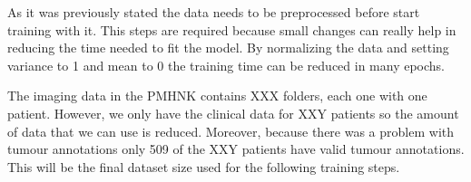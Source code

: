 

As it was previously stated the data needs to be preprocessed before start training with it.
This steps are required because small changes can really help in reducing the time needed to
fit the model. By normalizing the data and setting variance to 1 and mean to 0 the training time
can be reduced in many epochs.



The imaging data in the \Gls{PMHNK} contains XXX folders, each one with one patient. However, 
we only have the clinical data for XXY patients so the amount of data that we can use is
reduced. Moreover, because there was a problem with tumour annotations only 509 of the XXY 
patients have valid tumour annotations. This will be the final dataset size used for the
following training steps.




